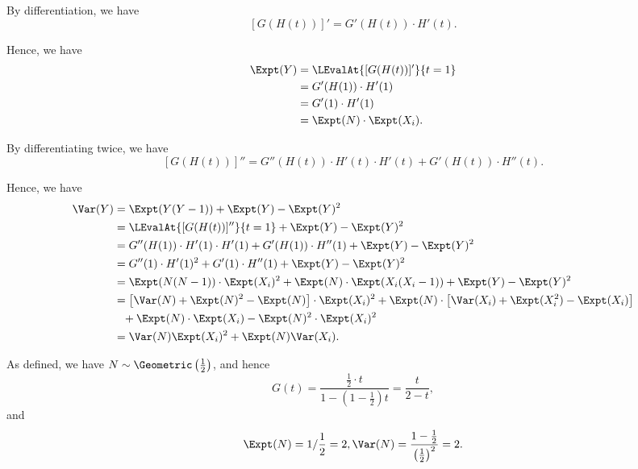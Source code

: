 \Question{\currfilebase}

By differentiation, we have
\[
    [G(H(t))]' = G'(H(t)) \cdot H'(t).
\]

Hence, we have
\begin{align*}
    \Expt(Y) & = \LEvalAt{[G(H(t))]'}{t = 1} \\
             & = G'(H(1)) \cdot H'(1)        \\
             & = G'(1) \cdot H'(1)           \\
             & = \Expt(N) \cdot \Expt(X_i).
\end{align*}

By differentiating twice, we have
\[
    [G(H(t))]'' = G''(H(t)) \cdot H'(t) \cdot H'(t) + G'(H(t)) \cdot H''(t).
\]

Hence, we have
\begin{align*}
    \Var(Y) & = \Expt(Y(Y - 1)) + \Expt(Y) - \Expt(Y)^2                                                                                             \\
            & = \LEvalAt{[G(H(t))]''}{t = 1}  + \Expt(Y) - \Expt(Y)^2                                                                               \\
            & = G''(H(1)) \cdot H'(1) \cdot H'(1) + G'(H(1)) \cdot H''(1)  + \Expt(Y) - \Expt(Y)^2                                                  \\
            & = G''(1) \cdot H'(1)^2 + G'(1) \cdot H''(1) + \Expt(Y) - \Expt(Y)^2                                                                   \\
            & = \Expt(N(N - 1)) \cdot \Expt(X_i)^2 + \Expt(N) \cdot \Expt(X_i (X_i - 1))  + \Expt(Y) - \Expt(Y)^2                                   \\
            & = \left[\Var(N) + \Expt(N)^2 - \Expt(N)\right] \cdot \Expt(X_i)^2 + \Expt(N) \cdot \left[\Var(X_i) + \Expt(X_i^2) - \Expt(X_i)\right] \\
            & \phantom{=} + \Expt(N) \cdot \Expt(X_i) - \Expt(N)^2 \cdot \Expt(X_i)^2                                                               \\
            & =\Var(N) \Expt(X_i)^2 + \Expt(N) \Var(X_i).
\end{align*}

As defined, we have \(N \sim \Geometric\left(\frac{1}{2}\right)\), and hence
\[
    G(t) = \frac{\frac{1}{2} \cdot t}{1 - \left(1 - \frac{1}{2}\right)t} = \frac{t}{2 - t},
\]
and
\[
    \Expt(N) = 1 / \frac{1}{2} = 2, \Var(N) = \frac{1 - \frac{1}{2}}{\left(\frac{1}{2}\right)^2} = 2.
\]

